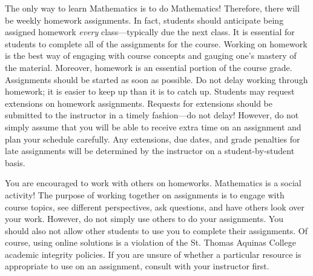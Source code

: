 \documentclass[11pt,letterpaper]{article}
\begin{document}
The only way to learn Mathematics is to do Mathematics! Therefore, there will be weekly homework assignments. In fact, students should anticipate being assigned homework {\itshape every} class---typically due the next class. It is essential for students to complete all of the assignments for the course. Working on homework is the best way of engaging with course concepts and gauging one's mastery of the material. Moreover, homework is an essential portion of the course grade. Assignments should be started as soon as possible. Do not delay working through homework; it is easier to keep up than it is to catch up. Students may request extensions on homework assignments. Requests for extensions should be submitted to the instructor in a timely fashion---do not delay! However, do not simply assume that you will be able to receive extra time on an assignment and plan your schedule carefully. Any extensions, due dates, and grade penalties for late assignments will be determined by the instructor on a student-by-student basis. \pspace

You are encouraged to work with others on homeworks. Mathematics is a social activity! The purpose of working together on assignments is to engage with course topics, see different perspectives, ask questions, and have others look over your work. However, do not simply use others to do your assignments. You should also not allow other students to use you to complete their assignments. Of course, using online solutions is a violation of the St. Thomas Aquinas College academic integrity policies. If you are unsure of whether a particular resource is appropriate to use on an assignment, consult with your instructor first. \sectionbreak
\end{document}
